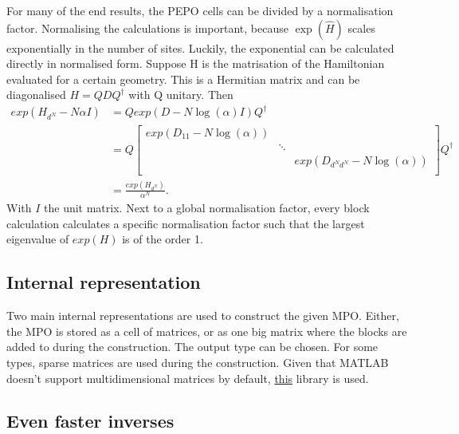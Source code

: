 For many of the end results, the PEPO cells can be divided by a normalisation factor. Normalising the calculations is important, because $\exp( \hat{H})$ scales exponentially in the number of sites. Luckily, the exponential can be calculated directly in normalised form. Suppose H is the matrisation of the Hamiltonian evaluated for a certain geometry. This is a Hermitian matrix and can be diagonalised $H= Q D Q^{\dagger}$ with Q unitary. Then
\begin{align}
    exp(  H_{d^N} - N \alpha I  ) & =  Q exp(  D- N \log(\alpha ) I    ) Q^{\dagger} \\
                                  & =  Q \begin{bmatrix} exp(D_{1 1} - N \log(\alpha )) &        &                                     \\
                                               & \ddots &                                     \\
                                               &        & exp(D_{ d^N d^N} - N \log(\alpha )) \\
    \end{bmatrix}  Q^{\dagger}     \\
                                  & = \frac{  exp(  H_{d^N} ) }{ \alpha^N }.
\end{align}
With $I$ the unit matrix. Next to a global normalisation factor, every block calculation calculates a specific normalisation factor such that the largest eigenvalue of $exp(H)$ is of the order 1.

\subsection{Internal representation}

Two main internal representations are used to construct the given MPO. Either, the MPO is stored as a cell of matrices, or as one big matrix where the blocks are added to during the construction. The output type can be chosen. For some types, sparse matrices are used during the construction. Given that MATLAB doesn't support multidimensional matrices by default, \href{https://nl.mathworks.com/matlabcentral/fileexchange/29832-n-dimensional-sparse-arrays}{this}\cite{Matt} library is used.

\subsection{Even faster inverses}

